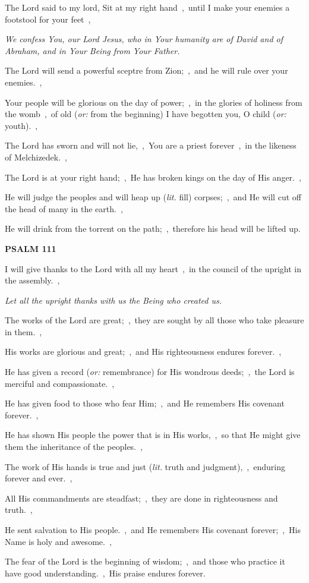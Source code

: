\documentclass[12pt,twoside,a5paper]{article}
\newcommand{\psalm}[1]{\textbf{PSALM {#1}}\nopagebreak}
\newcommand{\qanona}[1]{{\liturgicalhint{Qanona.} \emph{#1}}}
\newcommand{\translationoption}[1]{\emph{or:} #1}
\newcommand{\translationliteral}[1]{\emph{lit.} #1}
\begin{document}
\begin{normalparskip}
  The Lord said to my lord, Sit at my right hand~\sep\ until I make your enemies a footstool for your feet~\sep

  \qanona{We confess You, our Lord Jesus, who in Your humanity are of David and of Abraham, and in Your Being from Your Father.}

  The Lord will send a powerful sceptre from Zion;~\sep\ and he will rule over your enemies.~\sep

  Your people will be glorious on the day of power;~\sep\ in the glories of holiness from the womb~\sep\ of old (\translationoption{from the beginning}) I have begotten you, O child (\translationoption{youth}).~\sep

  The Lord has sworn and will not lie,~\sep\ You are a priest forever~\sep\ in the likeness of Melchizedek.~\sep

  The Lord is at your right hand;~\sep\ He has broken kings on the day of His anger.~\sep

  He will judge the peoples and will heap up (\translationliteral{fill}) corpses;~\sep\ and He will cut off the head of many in the earth.~\sep

  He will drink from the torrent on the path;~\sep\ therefore his head will be lifted up.
\end{normalparskip}

\psalm{111}

\begin{normalparskip}
  I will give thanks to the Lord with all my heart~\sep\ in the council of the upright in the assembly.~\sep

  \qanona{Let all the upright thanks with us the Being who created us.}

  The works of the Lord are great;~\sep\ they are sought by all those who take pleasure in them.~\sep

  His works are glorious and great;~\sep\ and His righteousness endures forever.~\sep

  He has given a record (\translationoption{remembrance}) for His wondrous deeds;~\sep\ the Lord is merciful and compassionate.~\sep

  He has given food to those who fear Him;~\sep\ and He remembers His covenant forever.~\sep

  He has shown His people the power that is in His works,~\sep\ so that He might give them the inheritance of the peoples.~\sep

  The work of His hands is true and just (\translationliteral{truth and judgment}),~\sep\ enduring forever and ever.~\sep

  All His commandments are steadfast;~\sep\ they are done in righteousness and truth.~\sep

  He sent salvation to His people.~\sep\ and He remembers His covenant forever;~\sep\ His Name is holy and awesome.~\sep

  The fear of the Lord is the beginning of wisdom;~\sep\ and those who practice it have good understanding.~\sep\ His praise endures forever.
\end{normalparskip}
\end{document}
